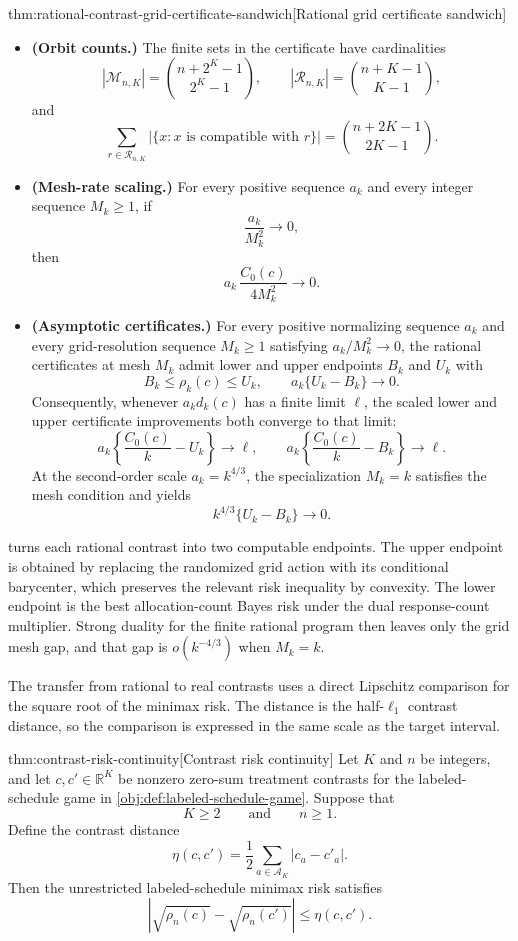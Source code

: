 \documentclass[11pt]{article}
\begin{document}
\begin{theoremv}{thm:rational-contrast-grid-certificate-sandwich}[Rational grid certificate sandwich]
\begin{itemize}
\[\leq
B_{n,c}(\nu_{n,M,c})+\frac{C_0(c)}{4M^2}.
\]
\item \textbf{(Orbit counts.)}  The finite sets in the certificate have cardinalities
\[
|\mathcal M_{n,K}|=\binom{n+2^K-1}{2^K-1},
\qquad
|\mathcal R_{n,K}|=\binom{n+K-1}{K-1},
\]
and
\[
\sum_{r\in\mathcal R_{n,K}}|\{x:x\text{ is compatible with }r\}|
=
\binom{n+2K-1}{2K-1}.
\]
\item \textbf{(Mesh-rate scaling.)}  For every positive sequence \(a_k\) and every integer sequence \(M_k\geq1\), if
\[
\frac{a_k}{M_k^2}\longrightarrow 0,
\]
then
\[
a_k\,\frac{C_0(c)}{4M_k^2}\longrightarrow 0.
\]
\item \textbf{(Asymptotic certificates.)}  For every positive normalizing sequence \(a_k\) and every grid-resolution sequence \(M_k\geq1\) satisfying \(a_k/M_k^2\to0\), the rational certificates at mesh \(M_k\) admit lower and upper endpoints \(B_{k}\) and \(U_{k}\) with
\[
B_k\leq \rho_k(c)\leq U_k,
\qquad
a_k\{U_k-B_k\}\longrightarrow 0.
\]
Consequently, whenever \(a_k d_k(c)\) has a finite limit \(\ell\), the scaled lower and upper certificate improvements both converge to that limit:
\[
a_k\left\{\frac{C_0(c)}{k}-U_k\right\}\longrightarrow \ell,
\qquad
a_k\left\{\frac{C_0(c)}{k}-B_k\right\}\longrightarrow \ell.
\]
At the second-order scale \(a_k=k^{4/3}\), the specialization \(M_k=k\) satisfies the mesh condition and yields
\[
k^{4/3}\{U_k-B_k\}\longrightarrow 0.
\]
\end{itemize}
\end{theoremv}

 turns each rational contrast into two computable endpoints. The upper endpoint is obtained by replacing the randomized grid action with its conditional barycenter, which preserves the relevant risk inequality by convexity. The lower endpoint is the best allocation-count Bayes risk under the dual response-count multiplier. Strong duality for the finite rational program then leaves only the grid mesh gap, and that gap is \(o(k^{-4/3})\) when \(M_k=k\).

The transfer from rational to real contrasts uses a direct Lipschitz comparison for the square root of the minimax risk. The distance is the half-\(\ell_1\) contrast distance, so the comparison is expressed in the same scale as the target interval.

\begin{theoremv}{thm:contrast-risk-continuity}[Contrast risk continuity]
Let \(K\) and \(n\) be integers, and let \(c,c'\in\mathbb R^K\) be nonzero zero-sum treatment contrasts for the labeled-schedule game in \cref{obj:def:labeled-schedule-game}. Suppose that
\[
K\ge 2
\qquad\text{and}\qquad
n\ge 1 .
\]
Define the contrast distance
\[
\eta(c,c')
=
\frac12\sum_{a\in\mathcal A_K}|c_a-c'_a| .
\]
Then the unrestricted labeled-schedule minimax risk satisfies
\[
\left|\sqrt{\rho_n(c)}-\sqrt{\rho_n(c')}\right|
\le
\eta(c,c') .
\]
\end{theoremv}
\end{document}
